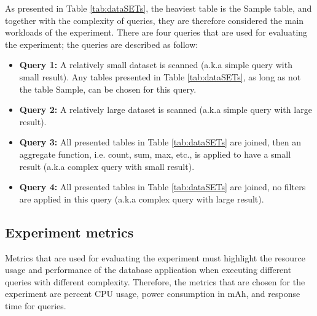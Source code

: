 As presented in Table \ref{tab:dataSETs}, the heaviest table is the Sample table, and together with the complexity of queries, they are therefore considered the main workloads of the experiment. There are four queries that are used for evaluating the experiment; the queries are described as follow:
\begin{itemize}
\item \textbf{Query 1:} A relatively small dataset is scanned (a.k.a simple query with small result). Any tables presented in Table \ref{tab:dataSETs}, as long as not the table Sample, can be chosen for this query.
\item \textbf{Query 2:} A relatively large dataset is scanned (a.k.a simple query with large result). 
\item \textbf{Query 3:} All presented tables in Table \ref{tab:dataSETs} are joined, then an aggregate function, i.e. count, sum, max, etc., is applied to have a small result (a.k.a complex query with small result).
\item \textbf{Query 4:} All presented tables in Table \ref{tab:dataSETs} are joined, no filters are applied in this query (a.k.a complex query with large result).
\end{itemize}
\subsection{Experiment metrics}
Metrics that are used for evaluating the experiment must highlight the resource usage and performance of the database application when executing different queries with different complexity. Therefore, the metrics that are chosen for the experiment are percent CPU usage, power consumption in mAh, and response time for queries. 
